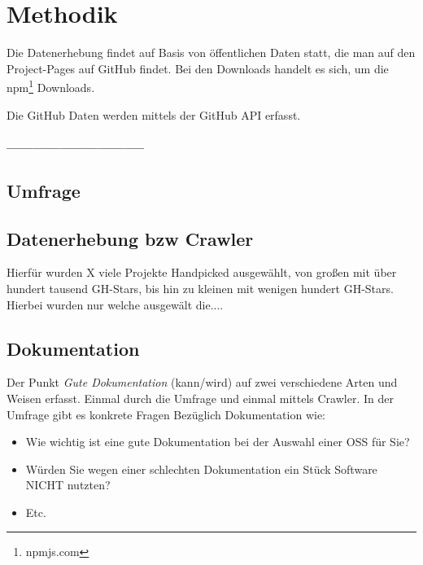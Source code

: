 \chapter{Methodik}

Die Datenerhebung findet auf Basis von öffentlichen Daten statt, die man auf den Project-Pages
auf GitHub findet. Bei den Downloads handelt es sich, um die npm\footnote{npmjs.com} Downloads.

\bigskip
\noindent
Die GitHub Daten werden mittels der GitHub API erfasst.












\subsubsection*{--------------------------------}

\section{Umfrage}


\section{Datenerhebung bzw Crawler}
Hierfür wurden X viele Projekte Handpicked ausgewählt, von großen mit über hundert tausend GH-Stars, bis hin
zu kleinen mit wenigen hundert GH-Stars. Hierbei wurden nur welche ausgewält die....


\section{Dokumentation}

Der Punkt \textit{Gute Dokumentation} (kann/wird) auf zwei verschiedene Arten und Weisen erfasst.
Einmal durch die Umfrage und einmal mittels Crawler. In der Umfrage gibt es konkrete Fragen Bezüglich
Dokumentation wie:
\begin{itemize}
    \item Wie wichtig ist eine gute Dokumentation bei der Auswahl einer OSS für Sie?
    \item Würden Sie wegen einer schlechten Dokumentation ein Stück Software NICHT nutzten?
    \item Etc.
\end{itemize}

